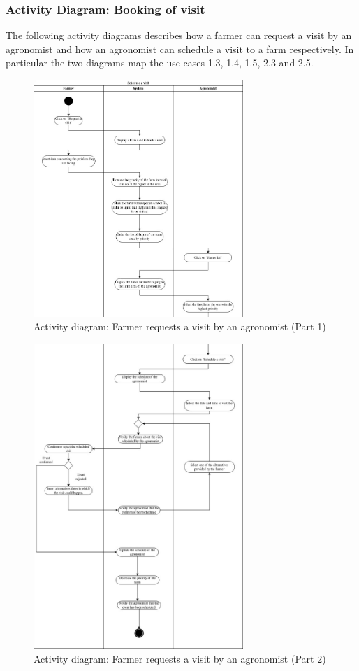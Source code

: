 \documentclass[10pt]{report}
\begin{document}
\subsubsection{Activity Diagram: Booking of  visit}
The following activity diagrams describes how a farmer can request a visit by an agronomist and how an agronomist can schedule a visit to a farm respectively. In particular the two diagrams map the use cases 1.3, 1.4, 1.5, 2.3 and 2.5.
\begin{figure}[H]
    \centering
    \includegraphics[width=300px]{ActivityDiagrams/BookingFromF_1.png}
    \caption{Activity diagram: Farmer requests a visit by an agronomist (Part 1)}
\end{figure}
\begin{figure}[H]
    \centering
    \includegraphics[width=300px]{ActivityDiagrams/BookingFromF_2.png}
    \caption{Activity diagram: Farmer requests a visit by an agronomist (Part 2)}
\end{figure}
\end{document}
